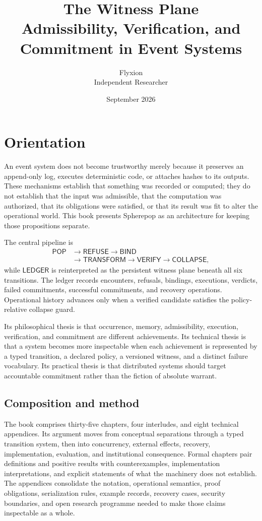 \documentclass[11pt,openany]{book}
\title{\textbf{The Witness Plane}\\[5pt]
\large Admissibility, Verification, and Commitment in Event Systems}
\author{Flyxion\\\small Independent Researcher}
\date{September 2026}
\newcommand{\Pop}{\mathsf{POP}}
\newcommand{\Refuse}{\mathsf{REFUSE}}
\newcommand{\Bind}{\mathsf{BIND}}
\newcommand{\Transform}{\mathsf{TRANSFORM}}
\newcommand{\Verify}{\mathsf{VERIFY}}
\newcommand{\Collapse}{\mathsf{COLLAPSE}}
\newcommand{\Ledger}{\mathsf{LEDGER}}
\begin{document}
\frontmatter
\maketitle

\chapter*{Orientation}

An event system does not become trustworthy merely because it preserves an
append-only log, executes deterministic code, or attaches hashes to its
outputs. These mechanisms establish that something was recorded or computed;
they do not establish that the input was admissible, that the computation was
authorized, that its obligations were satisfied, or that its result was fit to
alter the operational world. This book presents Spherepop as an
architecture for keeping those propositions separate.

The central pipeline is
\[
\begin{aligned}
  \Pop &\longrightarrow \Refuse \longrightarrow \Bind \\
       &\longrightarrow \Transform \longrightarrow \Verify
        \longrightarrow \Collapse,
\end{aligned}
\]
while \(\Ledger\) is reinterpreted as the persistent witness plane beneath all
six transitions. The ledger records encounters, refusals, bindings,
executions, verdicts, failed commitments, successful commitments, and recovery
operations. Operational history advances only when a verified candidate
satisfies the policy-relative collapse guard.

Its philosophical thesis is that occurrence, memory, admissibility,
execution, verification, and commitment are different achievements. Its
technical thesis is that a system becomes more inspectable when each
achievement is represented by a typed transition, a declared policy, a
versioned witness, and a distinct failure vocabulary. Its practical thesis is
that distributed systems should target accountable commitment rather than the
fiction of absolute warrant.

\section*{Composition and method}

The book comprises thirty-five chapters, four interludes, and eight technical
appendices. Its argument moves from conceptual separations through a typed
transition system, then into concurrency, external effects, recovery,
implementation, evaluation, and institutional consequence. Formal chapters
pair definitions and positive results with counterexamples, implementation
interpretations, and explicit statements of what the machinery does not
establish. The appendices consolidate the notation, operational semantics,
proof obligations, serialization rules, example records, recovery cases,
security boundaries, and open research programme needed to make those claims
inspectable as a whole.
\end{document}

